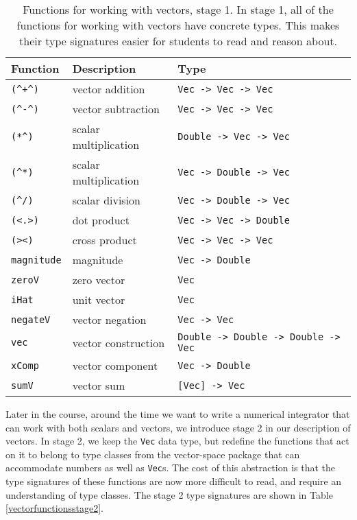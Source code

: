 \documentclass{eptcs}
\begin{document}
\begin{table}
\begin{center}
\begin{tabular}{lll}
Function      & Description           & Type \\ \hline
\verb|(^+^)| & vector addition       & \verb|Vec -> Vec -> Vec| \\
\verb|(^-^)| & vector subtraction    & \verb|Vec -> Vec -> Vec| \\
\verb|(*^)|  & scalar multiplication & \verb|Double -> Vec -> Vec| \\
\verb|(^*)|  & scalar multiplication & \verb|Vec -> Double -> Vec| \\
\verb|(^/)|  & scalar division       & \verb|Vec -> Double -> Vec| \\
\verb|(<.>)| & dot product           & \verb|Vec -> Vec -> Double| \\
\verb|(><)|  & cross product         & \verb|Vec -> Vec -> Vec| \\
\verb|magnitude| & magnitude        & \verb|Vec -> Double| \\
\verb|zeroV| & zero vector          & \verb|Vec| \\
\verb|iHat|  & unit vector           & \verb|Vec| \\
\verb|negateV| & vector negation    & \verb|Vec -> Vec| \\
\verb|vec|  & vector construction    & \verb|Double -> Double -> Double -> Vec| \\
\verb|xComp|  & vector component    & \verb|Vec -> Double| \\
\verb|sumV|   & vector sum          & \verb|[Vec] -> Vec| \\
\end{tabular}
\end{center}
\caption{Functions for working with vectors, stage 1.
In stage 1, all of the functions for working with vectors have concrete types.
This makes their type signatures easier for students to read and reason about.
}
\label{vectorfunctions}
\end{table}

Later in the course, around the time we want to write a numerical integrator that can
work with both scalars and vectors, we introduce stage 2 in our description of
vectors.  In stage 2, we keep the \verb|Vec| data type, but redefine the functions
that act on it to belong to type classes from the vector-space package\cite{vector-space}
that can accommodate numbers as well as
\verb|Vec|s.  The cost of this abstraction is that the type signatures of these functions are now 
more difficult to read, and require an understanding of type classes.
The stage 2 type signatures are shown in Table \ref{vectorfunctionsstage2}.
\end{document}
